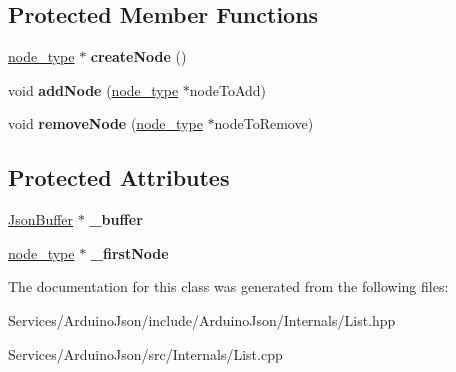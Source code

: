 \subsection*{Protected Member Functions}
\begin{DoxyCompactItemize}
\item 
\hypertarget{class_arduino_json_1_1_internals_1_1_list_ae6c203678f92189591813b43eff3a2fe}{}\hyperlink{struct_arduino_json_1_1_internals_1_1_list_node}{node\+\_\+type} $\ast$ {\bfseries create\+Node} ()\label{class_arduino_json_1_1_internals_1_1_list_ae6c203678f92189591813b43eff3a2fe}

\item 
\hypertarget{class_arduino_json_1_1_internals_1_1_list_abe0ad43df41d29c3513e86867c3266fe}{}void {\bfseries add\+Node} (\hyperlink{struct_arduino_json_1_1_internals_1_1_list_node}{node\+\_\+type} $\ast$node\+To\+Add)\label{class_arduino_json_1_1_internals_1_1_list_abe0ad43df41d29c3513e86867c3266fe}

\item 
\hypertarget{class_arduino_json_1_1_internals_1_1_list_a05da80e7c1e07d998d9219529edd0e80}{}void {\bfseries remove\+Node} (\hyperlink{struct_arduino_json_1_1_internals_1_1_list_node}{node\+\_\+type} $\ast$node\+To\+Remove)\label{class_arduino_json_1_1_internals_1_1_list_a05da80e7c1e07d998d9219529edd0e80}

\end{DoxyCompactItemize}
\subsection*{Protected Attributes}
\begin{DoxyCompactItemize}
\item 
\hypertarget{class_arduino_json_1_1_internals_1_1_list_a03a87a724dd160debd81d895047c9745}{}\hyperlink{class_arduino_json_1_1_json_buffer}{Json\+Buffer} $\ast$ {\bfseries \+\_\+buffer}\label{class_arduino_json_1_1_internals_1_1_list_a03a87a724dd160debd81d895047c9745}

\item 
\hypertarget{class_arduino_json_1_1_internals_1_1_list_a43e93069e8615279f6c3526fc968f0cf}{}\hyperlink{struct_arduino_json_1_1_internals_1_1_list_node}{node\+\_\+type} $\ast$ {\bfseries \+\_\+first\+Node}\label{class_arduino_json_1_1_internals_1_1_list_a43e93069e8615279f6c3526fc968f0cf}

\end{DoxyCompactItemize}


The documentation for this class was generated from the following files\+:\begin{DoxyCompactItemize}
\item 
Services/\+Arduino\+Json/include/\+Arduino\+Json/\+Internals/List.\+hpp\item 
Services/\+Arduino\+Json/src/\+Internals/List.\+cpp\end{DoxyCompactItemize}
